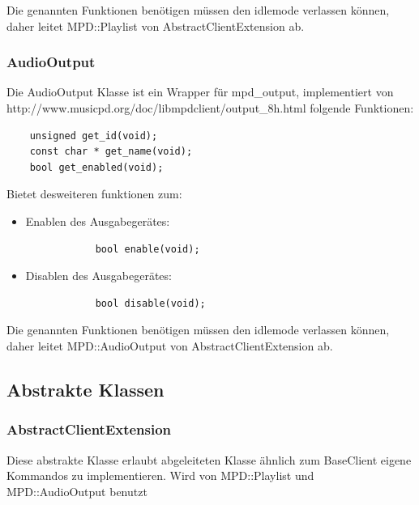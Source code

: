 Die genannten Funktionen benötigen müssen den idlemode verlassen können,
daher leitet MPD::Playlist von AbstractClientExtension ab.

\subsubsection{AudioOutput}
Die AudioOutput Klasse ist ein Wrapper für mpd\_output, implementiert von http://www.musicpd.org/doc/libmpdclient/output\_8h.html folgende Funktionen:
\begin{verbatim}
    unsigned get_id(void);
    const char * get_name(void);
    bool get_enabled(void);
\end{verbatim}

Bietet desweiteren funktionen zum:
\begin{itemize}
    \item Enablen des Ausgabegerätes:
        \begin{verbatim}
            bool enable(void);
        \end{verbatim}
    \item Disablen des Ausgabegerätes:
        \begin{verbatim}
            bool disable(void);
        \end{verbatim}
\end{itemize}


Die genannten Funktionen benötigen müssen den idlemode verlassen können,
daher leitet MPD::AudioOutput von AbstractClientExtension ab. 

\subsection{Abstrakte Klassen}
\subsubsection{AbstractClientExtension}
Diese abstrakte Klasse erlaubt abgeleiteten Klasse ähnlich zum BaseClient eigene Kommandos zu implementieren.
Wird von MPD::Playlist und MPD::AudioOutput benutzt


